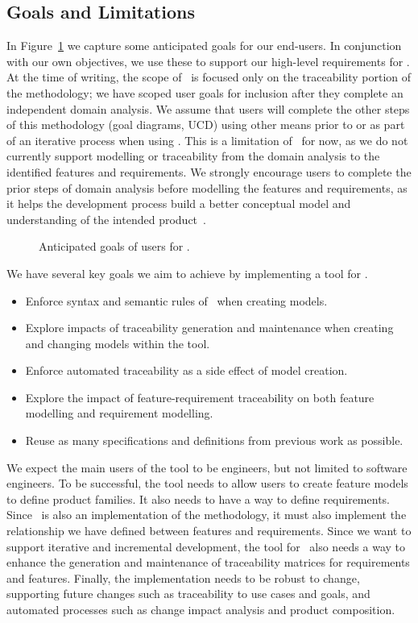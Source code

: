 \subsection{Goals and Limitations}

In Figure~\ref{fig:CyclicL_goals} we capture some anticipated goals for our end-users. In conjunction with our own objectives, we use these to support our high-level requirements for \tool. At the time of writing, the scope of \tool\ is focused only on the traceability portion of the methodology; we have scoped user goals for inclusion after they complete an independent domain analysis. We assume that users will complete the other steps of this methodology (goal diagrams, \gls{UCD}) using other means prior to or as part of an iterative process when using \tool. This is a limitation of \tool\ for now, as we do not currently support modelling or traceability from the domain analysis to the identified features and requirements. We strongly encourage users to complete the prior steps of domain analysis before modelling the features and requirements, as it helps the development process build a better conceptual model and understanding of the intended product~\cite{kang1990feature}.

\begin{figure}
	\centering
	
	\caption{Anticipated goals of users for \tool.}
	\label{fig:CyclicL_goals}
\end{figure}

We have several key goals we aim to achieve by implementing a tool for \tool. 

\begin{itemize}
	\item Enforce syntax and semantic rules of \tool\ when creating models.
	\item Explore impacts of traceability generation and maintenance when creating and changing models within the tool.
	\item Enforce automated traceability as a side effect of model creation.
	\item Explore the impact of feature-requirement traceability on both feature modelling and requirement modelling.
	\item Reuse as many specifications and definitions from previous work as possible.
\end{itemize}

We expect the main users of the tool to be engineers, but not limited to software engineers. To be successful, the tool needs to allow users to create feature models to define product families. It also needs to have a way to define requirements. Since \tool\ is also an implementation of the methodology, it must also implement the relationship we have defined between features and requirements. Since we want to support iterative and incremental development, the tool for \tool\ also needs a way to enhance the generation and maintenance of traceability matrices for requirements and features. Finally, the implementation needs to be robust to change, supporting future changes such as traceability to use cases and goals, and automated processes such as change impact analysis and product composition.


